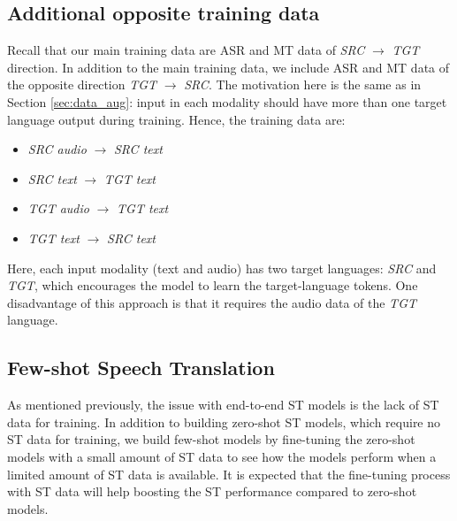 \documentclass[conference]{IEEEtran}
\begin{document}
	\subsection{Additional opposite training data}
	Recall that our main training data are ASR and MT data of \textit{SRC} $\rightarrow$ \textit{TGT} direction. In addition to the main training data, we include ASR and MT data of the opposite direction \textit{TGT} $\rightarrow$ \textit{SRC}. The motivation here is the same as in Section \ref{sec:data_aug}: input in each modality should have more than one target language output during training. Hence, the training data are:
	\setlength\multicolsep{3pt}
	\begin{multicols}{2}
		\begin{itemize}
			\item \textit{SRC audio} $\rightarrow$ \textit{SRC text}
			\item \textit{SRC text} $\rightarrow$ \textit{TGT text}
			\item \textit{TGT audio} $\rightarrow$ \textit{TGT text}
			\item \textit{TGT text} $\rightarrow$ \textit{SRC text}
		\end{itemize}
	\end{multicols}
	Here, each input modality (text and audio) has two target languages: \textit{SRC} and \textit{TGT}, which encourages the model to learn the target-language tokens. One disadvantage of this approach is that it requires the audio data of the \textit{TGT} language.
	
	\subsection{Few-shot Speech Translation}
	As mentioned previously, the issue with end-to-end ST models is the lack of ST data for training. In addition to building zero-shot ST models, which require no ST data for training, we build few-shot models by fine-tuning the zero-shot models with a small amount of ST data to see how the models perform when a limited amount of ST data is available. It is expected that the fine-tuning process with ST data will help boosting the ST performance compared to zero-shot models.
	
\end{document}
